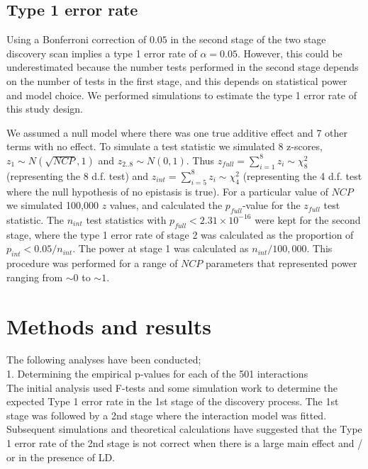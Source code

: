 \documentclass[paper=a4, fontsize=11pt]{scrartcl}					%
\numberwithin{equation}{section}									%
\numberwithin{figure}{section}										%
\numberwithin{table}{section}										%
\begin{document}
\subsection*{Type 1 error rate}

Using a Bonferroni correction of $0.05$ in the second stage of the two stage discovery scan implies a type 1 error rate of $\alpha = 0.05$. However, this could be underestimated because the number tests performed in the second stage depends on the number of tests in the first stage, and this depends on statistical power and model choice. We performed simulations to estimate the type 1 error rate of this study design.

We assumed a null model where there was one true additive effect and 7 other terms with no effect. To simulate a test statistic we simulated 8 z-scores, $z_1 \sim N(\sqrt{NCP}, 1)$ and $z_{2..8} \sim N(0,1)$. Thus $z_{full} = \sum^8_{i=1}{z_i} \sim \chi^{2}_{8}$ (representing the 8 d.f. test) and $z_{int} = \sum^8_{i=5}{z_i} \sim \chi^{2}_{4}$ (representing the 4 d.f. test where the null hypothesis of no epistasis is true). For a particular value of $NCP$ we simulated 100,000 $z$ values, and calculated the $p_{full}$-value for the $z_{full}$ test statistic. The $n_{int}$ test statistics with $p_{full} < 2.31 \times 10^{-16}$ were kept for the second stage, where the type 1 error rate of stage 2 was calculated as the proportion of $p_{int} < 0.05 / n_{int}$. The power at stage 1 was calculated as $n_{int} / 100,000$. This procedure was performed for a range of $NCP$ parameters that represented power ranging from $\sim 0$ to $\sim 1$.

\newpage

\section*{Methods and results}

The following analyses have been conducted; \\

1. Determining the empirical p-values for each of the 501 interactions \\

The initial analysis used F-tests and some simulation work to determine the expected Type 1 error rate in the 1st stage of the discovery process. The 1st stage was followed by a 2nd stage where the interaction model was fitted. Subsequent simulations and theoretical calculations have suggested that the Type 1 error rate of the 2nd stage is not correct when there is a large main effect and / or in the presence of LD.  \\
\end{document}
